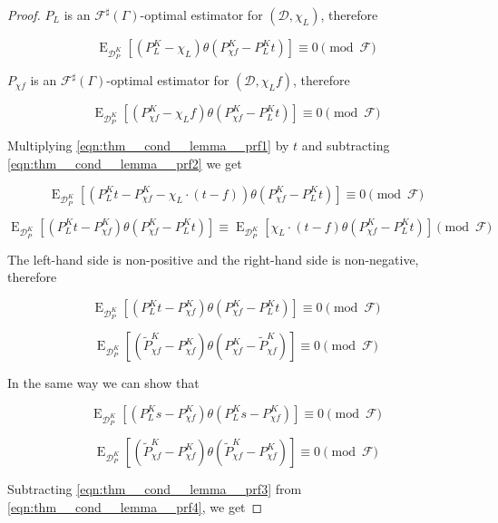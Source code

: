 \documentclass{article}
\numberwithin{equation}{section}
\theoremstyle{definition}
\theoremstyle{plain}
\DeclareMathOperator{\E}{E}
\newcommand{\Dist}{\mathcal{D}}
\newcommand{\Fall}{\mathcal{F}}
\newcommand{\ESG}{\Fall^\sharp(\Gamma)}
\begin{document}
\begin{proof}

$P_L$ is an $\ESG$-optimal estimator for $(\Dist, \chi_L)$, therefore

\begin{equation}
\label{eqn:thm__cond__lemma__prf1}
\E_{\Dist_P^K}[(P_L^K- \chi_L) \theta(P_{\chi f}^K- P_L^K t)] \equiv 0 \pmod \Fall
\end{equation}

$P_{\chi f}$ is an $\ESG$-optimal estimator for $(\Dist, \chi_L f)$, therefore

\begin{equation}
\label{eqn:thm__cond__lemma__prf2}
\E_{\Dist_P^K}[(P_{\chi f}^K - \chi_L f) \theta(P_{\chi f}^K - P_L^K t)] \equiv 0 \pmod \Fall
\end{equation}

Multiplying \ref{eqn:thm__cond__lemma__prf1} by $t$ and subtracting \ref{eqn:thm__cond__lemma__prf2} we get

\[\E_{\Dist_P^K}[(P_L^K t - P_{\chi f}^K - \chi_L \cdot (t - f)) \theta(P_{\chi f}^K- P_L^K t)] \equiv 0 \pmod \Fall\]

\[\E_{\Dist_P^K}[(P_L^K t - P_{\chi f}^K ) \theta(P_{\chi f}^K- P_L^K t)] \equiv \E_{\Dist_P^K}[\chi_L \cdot (t- f) \theta(P_{\chi f}^K- P_L^K t)] \pmod \Fall\]

The left-hand side is non-positive and the right-hand side is non-negative, therefore

\[\E_{\Dist_P^K}[(P_L^K t - P_{\chi f}^K ) \theta(P_{\chi f}^K- P_L^K t)] \equiv 0 \pmod \Fall\]

\begin{equation}
\label{eqn:thm__cond__lemma__prf3}
\E_{\Dist_P^K}[(\tilde{P}_{\chi f}^K - P_{\chi f}^K) \theta(P_{\chi f}^K - \tilde{P}_{\chi f}^K)] \equiv 0 \pmod \Fall
\end{equation}

In the same way we can show that

\[\E_{\Dist_P^K}[(P_L^K s - P_{\chi f}^K) \theta(P_L^K s-P_{\chi f}^K)] \equiv 0 \pmod \Fall\]

\begin{equation}
\label{eqn:thm__cond__lemma__prf4}
\E_{\Dist_P^K}[(\tilde{P}_{\chi f}^K - P_{\chi f}^K) \theta(\tilde{P}_{\chi f}^K-P_{\chi f}^K )] \equiv 0 \pmod \Fall
\end{equation}

Subtracting \ref{eqn:thm__cond__lemma__prf3} from \ref{eqn:thm__cond__lemma__prf4}, we get


\end{proof}
\end{document}
